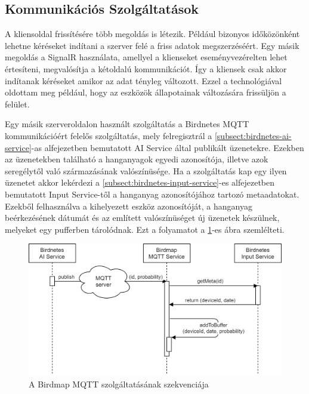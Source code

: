 \subsection{Kommunikációs Szolgáltatások}
A kliensoldal frissítésére több megoldás is létezik. Például bizonyos időközönként lehetne kéréseket indítani a szerver felé a friss adatok megszerzéséért.
Egy másik megoldás a SignalR használata, amellyel a klienseket eseményvezérelten lehet értesíteni, megvalósítja a kétoldalú kommunikációt.
Így a kliensek csak akkor indítanak kéréseket amikor az adat tényleg változott. Ezzel a technológiával oldottam meg például, hogy az eszközök állapotainak változására
frissüljön a felület.

Egy másik szerveroldalon használt szolgáltatás a Birdnetes MQTT kommunikációért felelős szolgáltatás, 
mely felregisztrál a \ref{subsect:birdnetes-ai-service}-as alfejezetben bemutatott AI Service által publikált üzenetekre.
Ezekben az üzenetekben található a hanganyagok egyedi azonosítója, illetve azok seregélytől való származásának valószínüsége.
Ha a szolgáltatás kap egy ilyen üzenetet akkor lekérdezi a \ref{subsect:birdnetes-input-service}-es alfejezetben bemutatott Input Service-től
a hanganyag azonosítójához tartozó metaadatokat. 
Ezekből felhasználva a kihelyezett eszköz azonosítóját, a hanganyag beérkezésének dátumát és az említett valószínüséget új üzenetek készülnek, melyeket egy pufferben tárolódnak.
Ezt a folyamatot a \ref{fig:birdmap-mqtt-service}-es ábra szemlélteti.

\begin{figure}[!ht]
    \centering
    \includegraphics[width=150mm, keepaspectratio]{figures/mqtt-communication-sequence.png}
    \caption{A Birdmap MQTT szolgáltatásának szekvenciája}
    \label{fig:birdmap-mqtt-service}
\end{figure}

